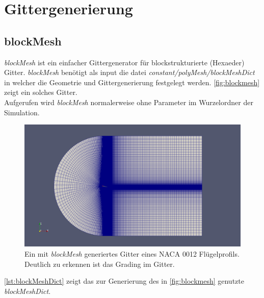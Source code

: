 \chapter{Gittergenerierung}

\section{blockMesh}
\textit{blockMesh} ist ein einfacher Gittergenerator für blockstrukturierte (Hexaeder) Gitter. \textit{blockMesh} benötigt als input die datei \textit{constant/polyMesh/blockMeshDict} in welcher die Geometrie und Gittergenerierung festgelegt werden. \autoref{fig:blockmesh} zeigt ein solches Gitter.
\\
Aufgerufen wird \textit{blockMesh} normalerweise ohne Parameter im Wurzelordner der Simulation.

\begin{figure}[htb]
  \centering
  \includegraphics[width=0.95\linewidth]{Abbildungen/blockmesh} 
  \caption[blockMesh Gitter]{Ein mit \textit{blockMesh} generiertes Gitter eines NACA 0012 Flügelprofils. Deutlich zu erkennen ist das Grading im Gitter.}
  \label{fig:blockmesh}
\end{figure}

\autoref{lst:blockMeshDict} zeigt das zur Generierung des in \autoref{fig:blockmesh} genutzte \textit{blockMeshDict}.


